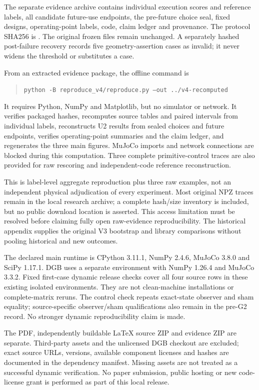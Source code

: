 The separate evidence archive contains individual execution scores and
reference labels, all candidate future-use endpoints, the pre-future choice
seal, fixed designs, operating-point labels, code, claim ledger and provenance.
The protocol SHA256 is
.
The original frozen files remain unchanged. A separately hashed post-failure
recovery records five geometry-assertion cases as invalid; it never widens the
threshold or substitutes a case.

From an extracted evidence package, the offline command is
\begin{quote}\small
\texttt{python -B reproduce\_v4/reproduce.py --out ../v4-recomputed}
\end{quote}
It requires Python, NumPy and Matplotlib, but no simulator or network. It
verifies packaged hashes, recomputes source tables and paired intervals from
individual labels, reconstructs U2 results from sealed choices and future
endpoints, verifies operating-point summaries and the claim ledger, and
regenerates the three main figures. MuJoCo imports and network connections are
blocked during this computation. Three complete primitive-control traces are
also provided for raw rescoring and independent-code reference reconstruction.

This is label-level aggregate reproduction plus three raw examples, not an
independent physical adjudication of every experiment. Most original NPZ traces
remain in the local research archive; a complete hash/size inventory is
included, but no public download location is asserted. This access limitation
must be resolved before claiming fully open raw-evidence reproducibility.
The historical appendix supplies the original V3 bootstrap and library
comparisons without pooling historical and new outcomes.

The declared main runtime is CPython 3.11.1, NumPy 2.4.6, MuJoCo 3.8.0 and
SciPy 1.17.1. DGB uses a separate environment with NumPy 1.26.4 and MuJoCo
3.3.2. Fixed first-case dynamic release checks cover all four source rows in
these existing isolated environments. They are not clean-machine installations
or complete-matrix reruns. The control check repeats exact-state observer and
sham equality; source-specific observer/sham qualifications also remain in the
pre-G2 record. No stronger dynamic reproducibility claim is made.

The PDF, independently buildable LaTeX source ZIP and evidence ZIP are separate.
Third-party assets and the unlicensed DGB checkout are excluded; exact source
URLs, versions, available component licenses and hashes are documented in the
dependency manifest. Missing assets are not treated as a successful dynamic
verification. No paper submission, public hosting or new code-license grant is
performed as part of this local release.
